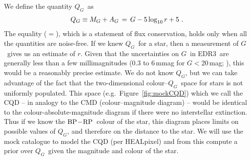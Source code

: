 \documentclass[twocolumn]{aastex62}
\providecommand{\logten}{\ensuremath{\log_{\rm 10}}}
\providecommand{\logten}{\ensuremath{\log_{\rm 10}}}
\providecommand{\release}{EDR3}
\providecommand{\gmag}{\ensuremath{G}}
\providecommand{\MG}{\ensuremath{M_G}}
\providecommand{\AG}{\ensuremath{A_G}}
\providecommand{\QG}{\ensuremath{Q_G}}
\providecommand{\bprp}{\ensuremath{{\rm BP} \! - \! {\rm RP}}}
\providecommand{\dist}{\ensuremath{r}}
\begin{document}
We define the quantity \QG\ as
\begin{equation}
  \QG \equiv \MG + \AG \,=\, \gmag - 5\logten\dist + 5 \ .
 \label{eqn:continuity}
\end{equation}
The equality ($=$), which is a statement of flux conservation, holds only when all the quantities are noise-free.
If we knew \QG\ for a star, then a measurement of \gmag\ gives us an estimate of \dist. Given that the uncertainties on \gmag\ in \release\ are generally less than a few millimagnitudes
(0.3 to 6\,mmag for $\gmag < 20$\,mag; \citealt{gedr3_release}),
this would be a reasonably precise estimate. We do not know \QG, but we can take advantage of the fact that the two-dimensional colour--\QG\ space for stars is not uniformly populated.
This space (e.g.\ Figure~\ref{fig:mockCQD}) which we call the CQD -- in analogy to the CMD (colour--magnitude diagram) -- would be identical to the colour-absolute-magnitude diagram if there were no interstellar extinction. Thus if we know the \bprp\ colour of the star, this diagram places limits on possible values of \QG, and therefore on the distance to the star. We will use the mock catalogue to model the CQD (per HEALpixel) and from this compute a prior over \QG\ given the magnitude and colour of the star.
\end{document}
